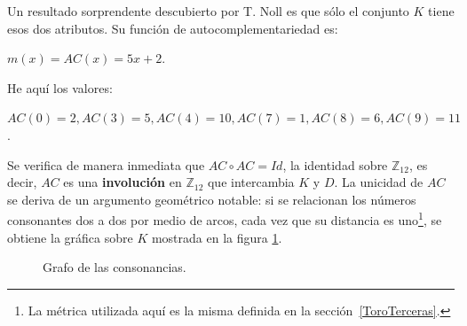 \documentclass[letterpaper,12pt]{book}
\theoremstyle{definition} \newtheorem{Def}{Definición}[chapter]
\theoremstyle{definition} \newtheorem{Teo}{Teorema}[chapter]
\theoremstyle{definition} \newtheorem{Pro}{Proposición}[chapter]
\theoremstyle{definition} \newtheorem{Lema}{Lema}[chapter]
\begin{document}
Un resultado sorprendente descubierto por T. Noll es que sólo el conjunto $K$ tiene esos dos atributos. Su función de autocomplementariedad es:
\begin{description}
\centering
\item $ m(x)=AC(x)=5x+2$. 
\end{description}

He aquí los valores:
\begin{description}
\centering
\item$AC(0)=2,AC(3)=5,AC(4)=10,AC(7)=1,AC(8)=6,AC(9)=11$.
\end{description}

Se verifica de manera inmediata que $AC \circ AC=Id$, la identidad sobre $\mathbb{Z}_{12}$, es decir, $AC$ es una \textbf{involución} en $\mathbb{Z}_{12}$ que intercambia $K$ y $D$. La unicidad de $AC$ se deriva de un argumento geométrico notable: si se relacionan los números consonantes dos a dos por medio de arcos, cada vez que su distancia es uno\footnote{La métrica utilizada aquí es la misma definida en la sección~\ref{ToroTerceras}.}, se obtiene la gráfica sobre $K$ mostrada en la figura \ref{Consonancias}. 


\begin{figure}[h]
\centering 
{}
\caption{\label{Consonancias}Grafo de las consonancias.}
\end{figure}  	
\end{document}
